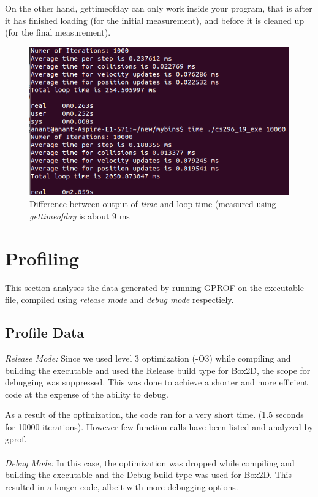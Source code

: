 \documentclass[11pt]{article}
\begin{document}
On the other hand, gettimeofday can only work inside your program, that is after it has finished loading (for the initial measurement), and before it is cleaned up (for the final measurement).
\begin{figure}[h]
\centering
\includegraphics[scale=0.5]{Selection_001.png}
\caption{Difference between output of \textit{time} and loop time (measured using \textit{gettimeofday} is about 9 ms}
\end{figure}

\section{Profiling}
This section analyses the data generated by running GPROF on the executable file, compiled using \textit{release mode} and \textit{debug mode} respectiely.

\subsection{Profile Data}
\textit{Release Mode:}
Since we used level 3 optimization (-O3) while compiling and building the executable and used the Release build type for Box2D, the scope for debugging was suppressed. This was done to achieve a shorter and more efficient code at the expense of the ability to debug.

As a result of the optimization, the code ran for a very short time. (1.5 seconds for 10000 iterations). However few function calls have been listed and analyzed by gprof.
\\
\\
\textit{Debug Mode:}
In this case, the optimization was dropped while compiling and building the executable and the Debug build type was used for Box2D. This resulted in a longer code, albeit with more debugging options.
\end{document}
